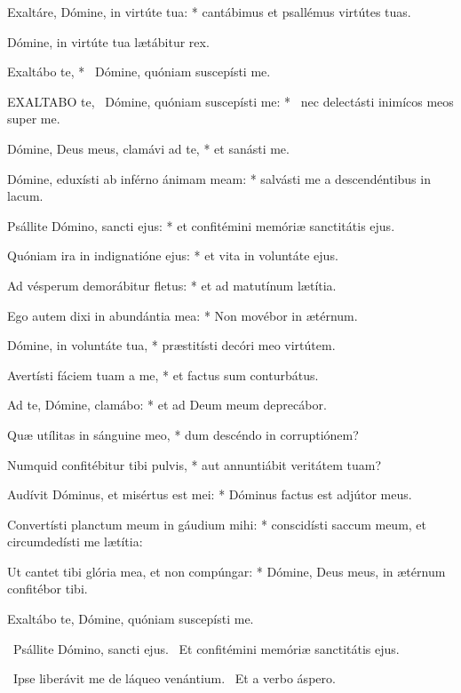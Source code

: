Exaltáre, Dómine, in virtúte tua: * cantábimus et psallémus virtútes tuas.

 Dómine, in virtúte tua lætábitur rex.

 Exaltábo te, * \textdagger\ Dómine, quóniam suscepísti me. \textdaggerdbl


\lettrine[lines=2]{E}{XALTABO} te, \textdagger\ Dómine, quóniam suscepísti me: * \textdaggerdbl\ nec delectásti inimícos meos super me.

Dómine, Deus meus, clamávi ad te, * et sanásti me.

Dómine, eduxísti ab inférno ánimam meam: * salvásti me a descendéntibus in lacum.

Psállite Dómino, sancti ejus: * et confitémini memóriæ sanctitátis ejus.

Quóniam ira in indignatióne ejus: * et vita in voluntáte ejus.

Ad vésperum demorábitur fletus: * et ad matutínum lætítia.

Ego autem dixi in abundántia mea: * Non movébor in ætérnum.

Dómine, in voluntáte tua, * præstitísti decóri meo virtútem.

Avertísti fáciem tuam a me, * et factus sum conturbátus.

Ad te, Dómine, clamábo: * et ad Deum meum deprecábor.

Quæ utílitas in sánguine meo, * dum descéndo in corruptiónem?

Numquid confitébitur tibi pulvis, * aut annuntiábit veritátem tuam?

Audívit Dóminus, et misértus est mei: * Dóminus factus est adjútor meus.

Convertísti planctum meum in gáudium mihi: * conscidísti saccum meum, et circumdedísti me lætítia:

Ut cantet tibi glória mea, et non compúngar: * Dómine, Deus meus, in ætérnum confitébor tibi.


 Exaltábo te, Dómine, quóniam suscepísti me.


\V\ Psállite Dómino, sancti ejus. \R\ Et confitémini memóriæ sanctitátis ejus.


\V\ Ipse liberávit me de láqueo venántium. \R\ Et a verbo áspero.

